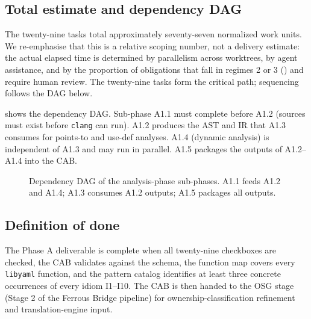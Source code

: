 \documentclass[12pt]{article}
\newcommand{\libyaml}{\texttt{libyaml}}
\theoremstyle{definition}
\theoremstyle{remark}
\begin{document}
\subsection{Total estimate and dependency DAG}
The twenty-nine tasks total approximately seventy-seven normalized work units. We re-emphasise that this is a relative scoping number, not a delivery estimate: the actual elapsed time is determined by parallelism across worktrees, by agent assistance, and by the proportion of obligations that fall in regimes 2 or 3 () and require human review. The twenty-nine tasks form the critical path; sequencing follows the DAG below.

 shows the dependency DAG. Sub-phase A1.1 must complete before A1.2 (sources must exist before \texttt{clang} can run). A1.2 produces the AST and IR that A1.3 consumes for points-to and use-def analyses. A1.4 (dynamic analysis) is independent of A1.3 and may run in parallel. A1.5 packages the outputs of A1.2--A1.4 into the CAB.

\begin{figure}[h]
\centering
{}
\caption{Dependency DAG of the analysis-phase sub-phases. A1.1 feeds A1.2 and A1.4; A1.3 consumes A1.2 outputs; A1.5 packages all outputs.}
\label{fig:dag}
\end{figure}

\subsection{Definition of done}
The Phase A deliverable is complete when all twenty-nine checkboxes are checked, the CAB validates against the schema, the function map covers every \libyaml{} function, and the pattern catalog identifies at least three concrete occurrences of every idiom I1--I10. The CAB is then handed to the OSG stage (Stage 2 of the Ferrous Bridge pipeline) for ownership-classification refinement and translation-engine input.
\end{document}
